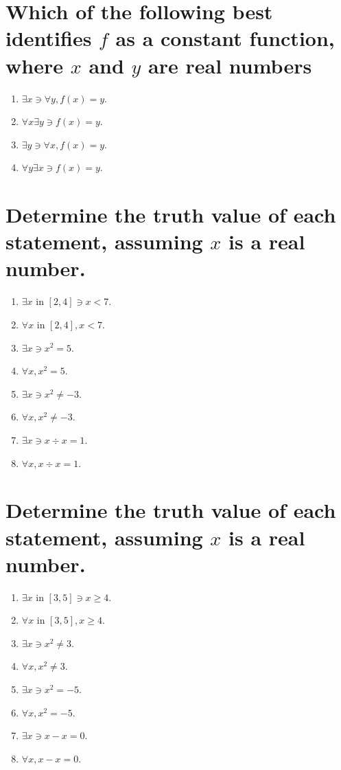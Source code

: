 \documentclass[11pt]{article} %
\begin{document}
\section{Which of the following best identifies $f$ as a constant function, where $x$ and $y$ are real numbers}
\begin{enumerate}
\item $\exists x \ni \forall y, f(x)=y$.
\item $\forall x \exists y \ni f(x) = y$.
\item $\exists y \ni \forall x, f(x) = y$.
\item $\forall y \exists x \ni f(x) = y$.
\end{enumerate}

\section{Determine the truth value of each statement, assuming $x$ is a real number.}
\begin{enumerate}
\item $\exists x$ in $\left[ 2,4 \right] \ni x<7$.
\item $\forall x$ in $\left[ 2,4 \right], x<7$.
\item $\exists x \ni x^2=5$.
\item $\forall x, x^2=5$.
\item $\exists x \ni x^2 \neq -3$.
\item $\forall x, x^2 \neq -3$.
\item $\exists x \ni x \div x = 1$.
\item $\forall x, x \div x = 1$.
\end{enumerate}

\section{Determine the truth value of each statement, assuming $x$ is a real number.}
\begin{enumerate}
\item $\exists x$ in $\left[ 3,5 \right]\ni x\geq4$.
\item $\forall x$ in $\left[ 3,5 \right], x\geq4$.
\item $\exists x \ni x^2 \neq 3$.
\item $\forall x, x^2 \neq 3$.
\item $\exists x \ni x^2 = -5$.
\item $\forall x, x^2 = -5$.
\item $\exists x \ni x-x=0$.
\item $\forall x, x-x=0$.
\end{enumerate}
\end{document}
